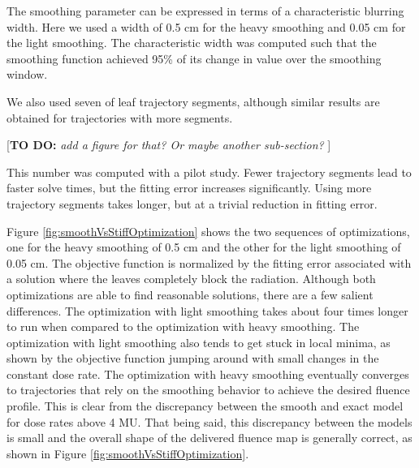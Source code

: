 \documentclass[12pt]{article}
\newcommand{\todo}[1]{{\color{lightblue}\par {[{\bf TO DO: } {\em #1}} ] \\    }}
\begin{document}
The smoothing parameter can be expressed in terms of a characteristic blurring width.
Here we used a width of 0.5 cm for the heavy smoothing and 0.05 cm for the light smoothing.
The characteristic width was computed such that the smoothing function achieved 95\% of its
change in value over the smoothing window.

We also used seven of leaf trajectory segments, although similar results are obtained for trajectories with more segments.
\todo{add a figure for that? Or maybe another sub-section?}
This number was computed with a pilot study.
Fewer trajectory segments lead to faster solve times, but the fitting error increases significantly.
Using more trajectory segments takes longer, but at a trivial reduction in fitting error.

Figure \ref{fig:smoothVsStiffOptimization} shows the two sequences of optimizations, one for the
heavy smoothing of 0.5 cm and the other for the light smoothing of 0.05 cm.
The objective function is normalized by the fitting error associated with a solution where the
leaves completely block the radiation.
Although both optimizations are able to find reasonable solutions, there are a few salient differences.
The optimization with light smoothing takes about four times longer to run when
compared to the optimization with heavy smoothing.
The optimization with light smoothing also tends to get stuck in local minima, as shown by the
objective function jumping around with small changes in the constant dose rate.
The optimization with heavy smoothing eventually converges to trajectories that rely on the
smoothing behavior to achieve the desired fluence profile. This is clear from the discrepancy
between the smooth and exact model for dose rates above 4 MU.
That being said, this discrepancy between the models is small and the overall shape of the delivered
fluence map is generally correct, as shown in Figure \ref{fig:smoothVsStiffOptimization}.
\end{document}

